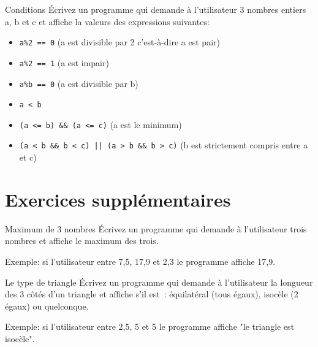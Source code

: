 \documentclass[a4paper,11pt]{article}
\begin{document}
	\begin{Exercice}{Conditions}
		\'Ecrivez un programme qui demande à l'utilisateur 
		3 nombres entiers a, b et c et affiche la valeurs des expressions suivantes:
		\begin{itemize}
			\item \texttt{a\%2 == 0}  (a est divisible par 2 c'est-à-dire a est pair)
			\item \texttt{a\%2 == 1}  (a est impair)
			\item \texttt{a\%b == 0}  (a est divisible par b)
			\item \texttt{a < b}
			\item \texttt{(a <= b) \&\& (a <= c)} (a est le minimum)
			\item \texttt{(a < b \&\& b < c) || (a > b \&\& b > c)} (b est strictement compris entre a et c)
		\end{itemize}
	\end{Exercice}


	

\section{Exercices supplémentaires}


	\begin{Exercice}{Maximum de 3 nombres}
		\'Ecrivez un programme qui demande à l'utilisateur 
		trois nombres  et affiche le maximum des trois.
		
		Exemple: si l'utilisateur entre 7,5, 17,9 et 2,3 le programme affiche 17,9. 
	\end{Exercice}

	\begin{Exercice}{Le type de triangle}
 		\'Ecrivez un programme qui demande à l'utilisateur 
		 la longueur des 3 côtés d'un triangle et affiche s'il est~: 
		 équilatéral (tous égaux), isocèle (2 égaux) ou quelconque.
		 
		 Exemple: si l'utilisateur entre 2,5, 5 et 5 le programme affiche "le triangle est isocèle". 
	\end{Exercice}
	
\end{document}

